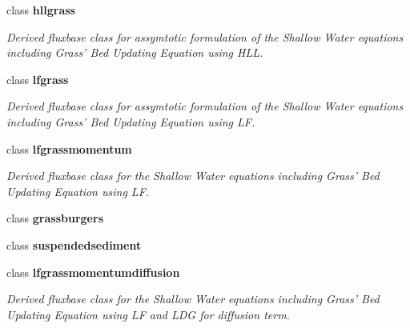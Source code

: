 \begin{DoxyCompactItemize}
class {\bf hllgrass}
\begin{DoxyCompactList}\small\item\em Derived fluxbase class for assymtotic formulation of the Shallow Water equations including Grass' Bed Updating Equation using H\-L\-L. \end{DoxyCompactList}\item 
class {\bf lfgrass}
\begin{DoxyCompactList}\small\item\em Derived fluxbase class for assymtotic formulation of the Shallow Water equations including Grass' Bed Updating Equation using L\-F. \end{DoxyCompactList}\item 
class {\bf lfgrassmomentum}
\begin{DoxyCompactList}\small\item\em Derived fluxbase class for the Shallow Water equations including Grass' Bed Updating Equation using L\-F. \end{DoxyCompactList}\item 
class {\bf grassburgers}
\item 
class {\bf suspendedsediment}
\item 
class {\bf lfgrassmomentumdiffusion}
\begin{DoxyCompactList}\small\item\em Derived fluxbase class for the Shallow Water equations including Grass' Bed Updating Equation using L\-F and L\-D\-G for diffusion term. \end{DoxyCompactList}\end{DoxyCompactItemize}
